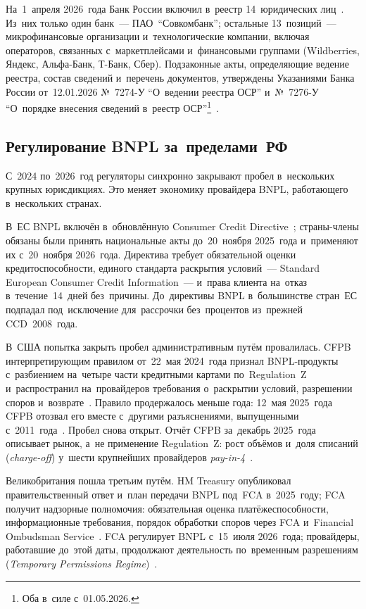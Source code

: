 На~1~апреля 2026~года Банк России включил в~реестр 14~юридических
лиц~\cite{cbr-osr-registry-2026}. Из~них только один банк~---
ПАО~\enquote{Совкомбанк}; остальные 13~позиций~--- микрофинансовые организации
и~технологические компании, включая операторов, связанных с~маркетплейсами
и~финансовыми группами (Wildberries, Яндекс, Альфа-Банк, Т-Банк, Сбер).
Подзаконные акты, определяющие ведение реестра, состав сведений
и~перечень документов,
утверждены Указаниями Банка России от~12.01.2026 №~7274-У \enquote{О~ведении
реестра ОСР} и~№~7276-У \enquote{О~порядке внесения сведений в~реестр ОСР}\footnote{Оба
в~силе с~01.05.2026.}~\cite{cbr-7274u-osr,cbr-7276u-osr}.

\subsection*{Регулирование BNPL за~пределами~РФ}

С~2024 по~2026~год регуляторы синхронно закрывают пробел в~нескольких крупных
юрисдикциях. Это меняет экономику провайдера BNPL, работающего в~нескольких
странах.

В~ЕС BNPL включён в~обновлённую Consumer Credit Directive~\cite{eu-ccd-2023};
страны-члены обязаны были принять национальные акты до~20~ноября 2025~года
и~применяют их с~20~ноября 2026~года.
Директива требует обязательной оценки кредитоспособности, единого стандарта
раскрытия условий~--- Standard European Consumer Credit Information~--- и~права
клиента на~отказ в~течение~14~дней без~причины. До~директивы BNPL в~большинстве
стран~ЕС подпадал под~исключение для~рассрочки без~процентов из~прежней
CCD~2008~года.

В~США попытка закрыть пробел административным путём провалилась. CFPB
интерпретирующим правилом от~22~мая 2024~года признал BNPL-продукты
с~разбиением на~четыре части кредитными картами по~Regulation~Z и~распространил
на~провайдеров требования о~раскрытии условий, разрешении споров
и~возврате~\cite{cfpb-bnpl-interpretive-rule-2024}. Правило продержалось меньше
года: 12~мая 2025~года CFPB отозвал его вместе с~другими разъяснениями, выпущенными
с~2011~года~\cite{cfpb-bnpl-rule-withdrawal-2025}.
Пробел снова открыт. Отчёт CFPB за~декабрь 2025~года описывает рынок, а~не
применение Regulation~Z: рост объёмов и~доля списаний (\textit{charge-off})
у~шести крупнейших провайдеров \textit{pay-in-4}~\cite{cfpb-bnpl-2025}.

Великобритания пошла третьим путём. HM Treasury опубликовал правительственный
ответ и~план передачи BNPL под~FCA в~2025~году; FCA получит надзорные
полномочия: обязательная оценка платёжеспособности, информационные требования,
порядок обработки споров через FCA и~Financial Ombudsman Service~\cite{fca-bnpl-2025}.
FCA регулирует BNPL с~15~июля 2026~года; провайдеры, работавшие до~этой даты,
продолжают деятельность по~временным разрешениям (\textit{Temporary Permissions
Regime})~\cite{fca-regulating-bnpl}.

